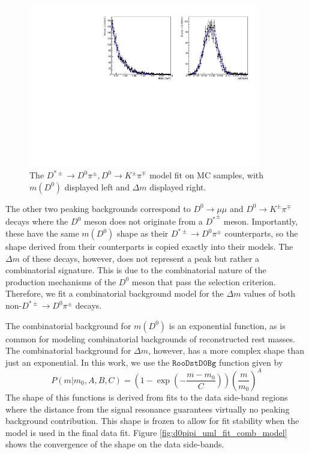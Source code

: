 \begin{figure}[htp]
    \begin{center}
      \includegraphics[width=0.9\textwidth]{figures/chapter4/normalization_fit/dpipi_fit_mc_kpi.pdf}
    \end{center}
    \caption{
      The $D^{*\pm} \to D^0\pi^\pm, D^0 \to K^\pm \pi^\mp$ model fit on MC samples, with $m(D^0)$ displayed left and $\Delta m$ displayed right.
    }
    \label{fig:d0pipi_uml_fit_kpi_model}
\end{figure}

The other two peaking backgrounds correspond to $D^0 \to \mu \mu$ and $D^0 \to K^\pm \pi^\mp$ decays where the $D^0$ meson does not originate from a ${D^*}^\pm$ meson. Importantly, these have the same $m(D^0)$ shape as their $D^{*\pm} \to D^0 \pi^\pm$ counterparts, so the shape derived from their counterparts is copied exactly into their models. The $\Delta m$ of these decays, however, does not represent a peak but rather a combinatorial signature. This is due to the combinatorial nature of the production mechanisms of the $D^0$ meson that pass the selection criterion. Therefore, we fit a combinatorial background model for the $\Delta m$ values of both non-$D^{*\pm} \to D^0 \pi^\pm$ decays. 

The combinatorial background for $m(D^0)$ is an exponential function, as is common for modeling combinatorial backgrounds of reconstructed rest masses. The combinatorial background for $\Delta m$, however, has a more complex shape than just an exponential. In this work, we use the $\texttt{RooDstD0Bg}$ function \cite{ref:verkerke2003roofit} given by
\begin{equation}
    P(m|m_0, A, B, C) = \left(1 - \exp \left(-\frac{m-m_0}{C} \right) \right) \left( \frac{m}{m_0}\right)^A
\end{equation}
The shape of this functions is derived from fits to the data side-band regions where the distance from the signal resonance guarantees virtually no peaking background contribution. This shape is frozen to allow for fit stability when the model is used in the final data fit. Figure \ref{fig:d0pipi_uml_fit_comb_model} shows the convergence of the shape on the data side-bands.

